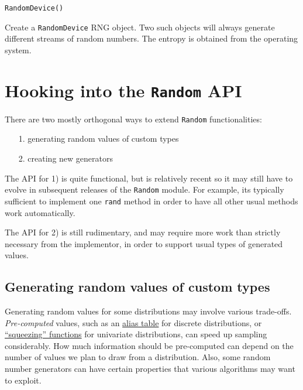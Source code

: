 \begin{adjustwidth}{2em}{0pt}


\begin{verbatim}
RandomDevice()
\end{verbatim}

Create a \texttt{RandomDevice} RNG object. Two such objects will always generate different streams of random numbers. The entropy is obtained from the operating system.



\end{adjustwidth}

\hypertarget{17771818288641906623}{}


\section{Hooking into the \texttt{Random} API}



There are two mostly orthogonal ways to extend \texttt{Random} functionalities:



\begin{itemize}
\item[1. ] generating random values of custom types


\item[2. ] creating new generators

\end{itemize}


The API for 1) is quite functional, but is relatively recent so it may still have to evolve in subsequent releases of the \texttt{Random} module. For example, it{\textquotesingle}s typically sufficient to implement one \texttt{rand} method in order to have all other usual methods work automatically.



The API for 2) is still rudimentary, and may require more work than strictly necessary from the implementor, in order to support usual types of generated values.



\hypertarget{7184618023384207012}{}


\subsection{Generating random values of custom types}



Generating random values for some distributions may involve various trade-offs. \emph{Pre-computed} values, such as an \href{https://en.wikipedia.org/wiki/Alias\_method}{alias table} for discrete distributions, or \href{https://en.wikipedia.org/wiki/Rejection\_sampling}{“squeezing” functions} for univariate distributions, can speed up sampling considerably. How much information should be pre-computed can depend on the number of values we plan to draw from a distribution. Also, some random number generators can have certain properties that various algorithms may want to exploit.



